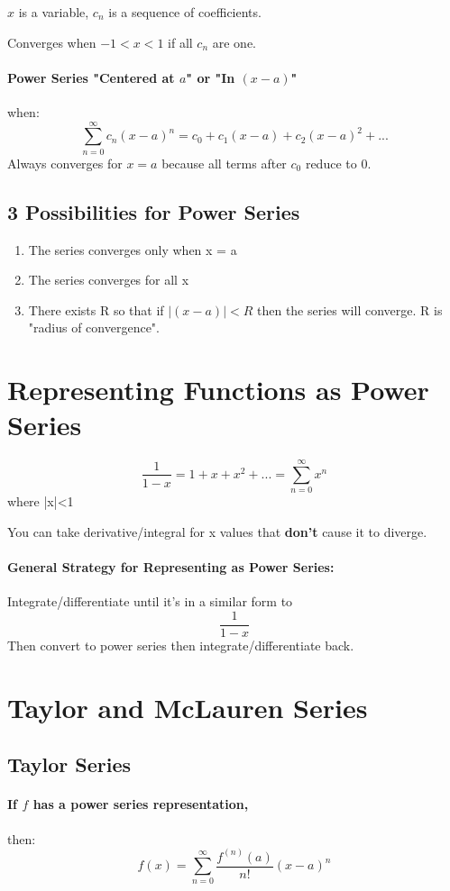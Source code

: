\documentclass[a4paper,12pt]{report}
\begin{document}
$x$ is a variable, $c_n$ is a sequence of coefficients.

Converges when $-1 < x < 1$ if all $c_n$ are one. 

\paragraph{Power Series "Centered at $a$" or "In $(x-a)$"} when:
$$\sum_{n=0}^{\infty} c_n(x-a)^n = c_0 + c_1(x-a) + c_2(x-a)^2 + ...$$
Always converges for $x = a$ because all terms after $c_0$ reduce to 0.

\subsection{3 Possibilities for Power Series}
\begin{enumerate}
\item The series converges only when x = a
\item The series converges for all x
\item There exists R so that if $|(x-a)| < R$ then the series will converge. R is "radius of convergence".
\end{enumerate}

\section{Representing Functions as Power Series}
$$\frac{1}{1-x} = 1 + x + x^2 + ... = \sum_{n=0}^{\infty}x^n$$ where |x|<1

You can take derivative/integral for x values that \textbf{don't} cause it to diverge.

\paragraph{General Strategy for Representing as Power Series: }
Integrate/differentiate until it's in a similar form to $$\frac{1}{1-x}$$
Then convert to power series then integrate/differentiate back.

\section{Taylor and McLauren Series}
\subsection{Taylor Series}
\paragraph{If $f$ has a power series representation, } then:
$$f(x) = \sum_{n=0}^{\infty} \frac{f^{(n)} (a)}{n!} (x-a)^n$$
\end{document}

